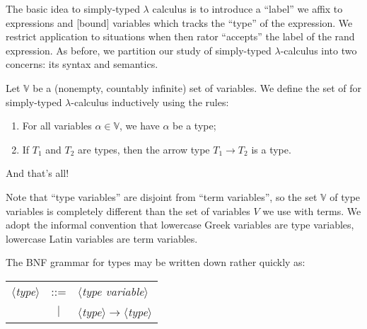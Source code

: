 \begin{node}\label{stlc-0000}%
The basic idea to simply-typed $\lambda$ calculus is to introduce a
``label'' we affix to expressions and [bound] variables which tracks the
``type'' of the expression. We restrict application to situations when
then rator ``accepts'' the label of the rand expression. As before, we
partition our study of simply-typed $\lambda$-calculus into two
concerns: its syntax and semantics.
\end{node}

\begin{node}[Syntax]\label{stlc-0001}%
\begin{definition}\label{stlc-0002}%
Let $\mathbb{V}$ be a (nonempty, countably infinite) set of
variables. We define the set of  for simply-typed
$\lambda$-calculus inductively using the rules:
\begin{enumerate}
\item For all variables $\alpha\in\mathbb{V}$, we have $\alpha$ be a type;
\item If $T_{1}$ and $T_{2}$ are types, then the arrow type $T_{1}\to T_{2}$
  is a type.
\end{enumerate}
And that's all!

\begin{node}\label{stlc-0004}%
Note that ``type variables'' are disjoint from ``term variables'', so
the set $\mathbb{V}$ of type variables is completely different than the
set of variables $V$ we use with terms. We adopt the informal convention
that lowercase Greek variables are type variables, lowercase Latin
variables are term variables.
\end{node}

\begin{node}\label{stlc-0003}%
The BNF grammar for types may be written down rather quickly as:
\begin{center}
\begin{tabular}{rcl}
$\langle$\textit{type}$\rangle$ & ::= & $\langle$\textit{type variable}$\rangle$\\
& $|$ & $\langle$\textit{type}$\rangle\to\langle$\textit{type}$\rangle$
\end{tabular}
\end{center}
\end{node}


\end{definition}
\end{node}
